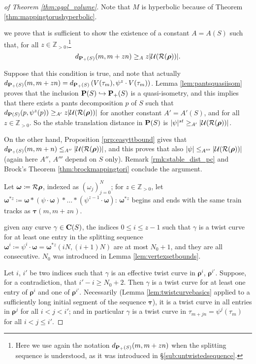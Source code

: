 \begin{proof}[of Theorem \ref{thm:agol_volume}]
Note that $M$ is hyperbolic because of Theorem \ref{thm:mappingtorushyperbolic}.

 we prove that is sufficient to show the existence of a constant $A=A(S)$ such that, for all $z\in \mathbb Z_{>0}$,\footnote{Here we use again the notation $d_{{\mathbf{P}_+}(S)}(m,m+zn)$ when the splitting sequence is understood, as it was introduced in \S \ref{sub:untwistedsequence}.}
$$
d_{{\mathbf{P}_+}(S)}(m,m+zn)\geq_A z|{\mathcal U}({\mathcal R}(\bm\rho))|.
$$

Suppose that this condition is true, and note that actually $d_{\pa(S)}(m,m+zn)=\linebreak d_{\pa(S)}\left(V(\tau_m),\psi^z\cdot V(\tau_m)\right)$. Lemma \ref{lem:pantsquasiisom} proves that the inclusion $\mathbf P(S)\hookrightarrow {\mathbf{P}_+}(S)$ is a quasi-isometry, and this implies that there exists a pants decomposition $p$ of $S$ such that $d_{\mathbf P(S)}(p, \psi^z(p))\geq_{A'} z|{\mathcal U}({\mathcal R}(\bm\rho))|$ for another constant $A'=A'(S)$, and for all $z\in \mathbb Z_{>0}$. So the stable translation distance in $\mathbf P(S)$ is $|\psi|^{st} \geq_{A'} |{\mathcal U}({\mathcal R}(\bm\rho))|$.

On the other hand, Proposition \ref{prp:easyttbound} gives that $d_{{\mathbf{P}_+}(S)}(m,m+n)\leq_{A''} |{\mathcal U}({\mathcal R}(\bm\rho))|$, and this proves that also $|\psi|\leq_{A'''} |{\mathcal U}({\mathcal R}(\bm\rho))|$ (again here $A''$, $A'''$ depend on $S$ only). Remark \ref{rmk:stable_dist_pc} and Brock's Theorem \ref{thm:brockmappingtori} conclude the argument.

Let $\bm\omega\coloneqq{\mathcal R}\bm\rho$, indexed as $(\omega_j)_{j=0}^N$; for $z\in \mathbb Z_{>0}$, let $\bm\omega^{*z}\coloneqq \bm\omega*(\psi\cdot \bm\omega)*\ldots*(\psi^{z-1}\cdot \bm\omega)$: $\bm\omega^{*z}$ begins and ends with the same train tracks as $\bm\tau(m,m+zn)$.

 given any curve $\gamma\in \mathbf C(S)$, the indices $0\leq i \leq z-1$ such that $\gamma$ is a twist curve for at least one entry in the splitting sequence $\bm\omega^i\coloneqq \psi^i\cdot\bm\omega =\bm\omega^{*z}\left(iN,(i+1)N\right)$ are at most $N_0+1$, and they are all consecutive. $N_0$ was introduced in Lemma \ref{lem:vertexsetbounds}.

Let $i$, $i'$ be two indices such that $\gamma$ is an effective twist curve in $\bm\rho^i$, $\bm\rho^{i'}$. Suppose, for a contradiction, that $i'-i\geq N_0+2$. Then $\gamma$ is a twist curve for at least one entry of $\bm\rho^i$ and one of $\bm\rho^{i'}$. Necessarily (Lemma \ref{lem:twistcurvebasics} applied to a sufficiently long initial segment of the sequence $\bm\tau$), it is a twist curve in all entries in $\bm\rho^j$ for all $i<j<i'$; and in particular $\gamma$ is a twist curve in $\tau_{m+jn}=\psi^j(\tau_m)$ for all $i<j\leq i'$.


\end{proof}

